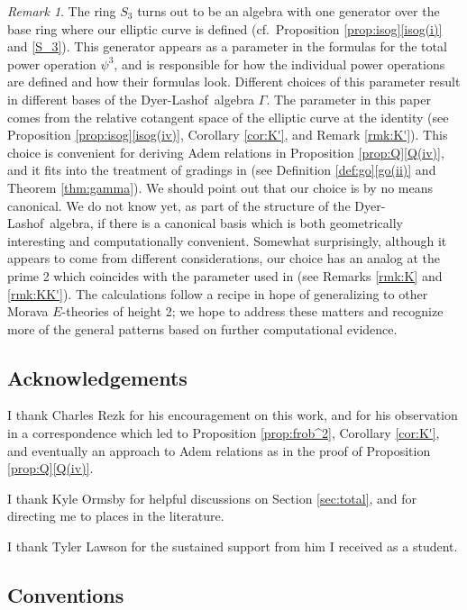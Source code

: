 \documentclass{gtpart}
\theoremstyle{definition}
\theoremstyle{remark}
\newtheorem{rmk}[thm]{Remark}
\newcommand{\DL}{Dyer-Lashof~}
\newcommand{\G}{\Gamma}
\newcommand{\p}{\psi^3}
\newcommand{\isog}[1]{Proposition \ref{prop:isog}\thinspace \eqref{isog(#1)}}
\newcommand{\q}[1]{Proposition \ref{prop:Q}\thinspace \eqref{Q(#1)}}
\newcommand{\go}[1]{Definition \ref{def:go}\thinspace \eqref{go(#1)}}
\begin{document}
\begin{rmk}
\label{rmk:parameter}
 The ring $S_3$ turns out to be an algebra with one generator over the 
 base ring where our elliptic curve is defined (cf.~\isog{i} and 
 \eqref{S_3}).  This generator appears as a parameter in the formulas 
 for the total power operation $\p$, and is responsible for how the 
 individual power operations are defined and how their formulas look.  
 Different choices of this parameter result in different bases of the 
 \DL algebra $\G$.  The parameter in this paper comes from the relative 
 cotangent space of the elliptic curve at the identity (see \isog{iv}, 
 Corollary \ref{cor:K'}, and Remark \ref{rmk:K'}).  This choice is 
 convenient for deriving Adem relations in \q{iv}, and it fits into the 
 treatment of gradings in \cite[Section 2]{cong} (see \go{ii} and 
 Theorem \ref{thm:gamma}).  We should point out that our choice is by no 
 means canonical.  We do not know yet, as part of the structure of the 
 \DL algebra, if there is a canonical basis which is both geometrically 
 interesting and computationally convenient.  Somewhat surprisingly, 
 although it appears to come from different considerations, our choice 
 has an analog at the prime 2 which coincides with the parameter used in 
 \cite{h2p2} (see Remarks \ref{rmk:K} and \ref{rmk:KK'}).  The 
 calculations follow a recipe in hope of generalizing to other Morava 
 $E$-theories of height 2; we hope to address these matters and 
 recognize more of the general patterns based on further computational 
 evidence.  
\end{rmk}


\subsection{Acknowledgements}

I thank Charles Rezk for his encouragement on this work, and for his 
observation in a correspondence which led to Proposition 
\ref{prop:frob^2}, Corollary \ref{cor:K'}, and eventually an approach to 
Adem relations as in the proof of \q{iv}.  

I thank Kyle Ormsby for helpful discussions on Section \ref{sec:total}, 
and for directing me to places in the literature.  

I thank Tyler Lawson for the sustained support from him I received as a 
student.  


\subsection{Conventions}
\end{document}
